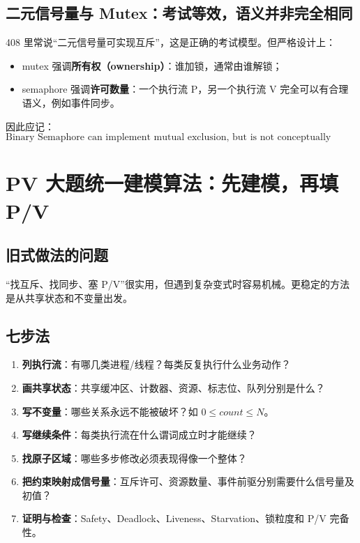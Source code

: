 \documentclass[11pt,a4paper]{ctexart}
\newcommand{\kw}[1]{\textbf{#1}}
\begin{document}
\subsection{二元信号量与 Mutex：考试等效，语义并非完全相同}

408 里常说“二元信号量可实现互斥”，这是正确的考试模型。但严格设计上：
\begin{itemize}
\item mutex 强调\kw{所有权（ownership）}：谁加锁，通常由谁解锁；
\item semaphore 强调\kw{许可数量}：一个执行流 P，另一个执行流 V 完全可以有合理语义，例如事件同步。
\end{itemize}
因此应记：
\[
\boxed{\text{Binary Semaphore can implement mutual exclusion, but is not conceptually identical to a mutex.}}
\]

\section{PV 大题统一建模算法：先建模，再填 P/V}

\subsection{旧式做法的问题}

“找互斥、找同步、塞 P/V”很实用，但遇到复杂变式时容易机械。更稳定的方法是从共享状态和不变量出发。

\subsection{七步法}

\begin{method}[PV 通用七步法]
\begin{enumerate}
\item \kw{列执行流}：有哪几类进程/线程？每类反复执行什么业务动作？
\item \kw{画共享状态}：共享缓冲区、计数器、资源、标志位、队列分别是什么？
\item \kw{写不变量}：哪些关系永远不能被破坏？如 $0\le count\le N$。
\item \kw{写继续条件}：每类执行流在什么谓词成立时才能继续？
\item \kw{找原子区域}：哪些多步修改必须表现得像一个整体？
\item \kw{把约束映射成信号量}：互斥许可、资源数量、事件前驱分别需要什么信号量及初值？
\item \kw{证明与检查}：Safety、Deadlock、Liveness、Starvation、锁粒度和 P/V 完备性。
\end{enumerate}
\end{method}
\end{document}
